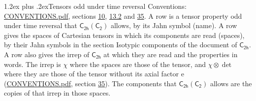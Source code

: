 \documentclass[10pt,a4paper]{article}
\makeatletter
\renewcommand\section{\@startsection{section}{1}{\z@}{-3ex plus -1ex minus -.2ex}%
  {1.2ex plus .2ex}{\normalfont\large\sffamily\bfseries\color{parttitle}}}
\numberwithin{equation}{section}
\newcommand{\grp}[1]{\mathsf{#1}}
\newcommand{\irrprod}{\otimes}
\makeatother
\begin{document}
\section{Tensors odd under time reversal}\label{s:time_odd}
Conventions: \href{../../CONVENTIONS.pdf}{CONVENTIONS.pdf}, sections \href{../../../rotation/CONVENTIONS.pdf\#conv.10}{10}, \href{../../../rotation/CONVENTIONS.pdf\#conv.13.2}{13.2} and \href{../../CONVENTIONS.pdf\#conv.35}{35}.
\leavevmode\label{n:head.name.property}A row is a tensor property odd under time reversal that $\grp{C_{2h}}(\grp{C_{2}})$ allows, by its Jahn symbol (name). \label{n:head.spaces}A row gives the spaces of Cartesian tensors in which its components are read (spaces), by their Jahn symbols in the section Isotypic components of the document of \href{../../../rotation/data/pdf/C2h.pdf}{$\grp{C_{2h}}$}. \label{n:head.properties}A row also gives the irrep of $\grp{C_{2h}}$ at which they are read and the properties in words. The irrep is $\chi$ where the spaces are those of the tensor, and $\chi \irrprod \det$ where they are those of the tensor without its axial factor e (\href{../../CONVENTIONS.pdf}{CONVENTIONS.pdf}, section \href{../../CONVENTIONS.pdf\#conv.35}{35}). The components that $\grp{C_{2h}}(\grp{C_{2}})$ allows are the copies of that irrep in those spaces.
\end{document}
